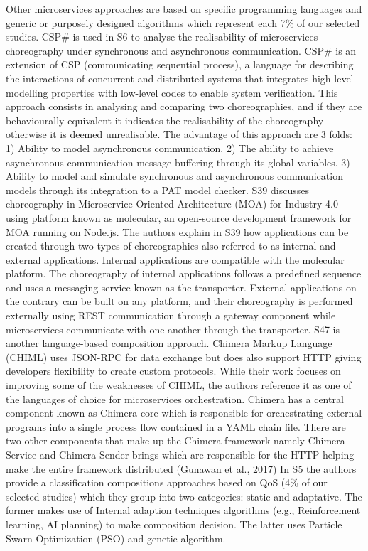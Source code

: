 \documentclass{article}
\begin{document}
\begin{multicols}{2}
Other microservices approaches are based on specific programming languages and generic or purposely designed algorithms which represent each 7\% of our selected studies. CSP\# is used in S6 to analyse the realisability of microservices choreography under synchronous and asynchronous communication. CSP\# is an extension of CSP (communicating sequential process), a language for describing the interactions of concurrent and distributed systems that integrates  high-level modelling properties with low-level codes to enable system verification. This approach consists in analysing and comparing two choreographies, and if they are behaviourally equivalent it indicates the realisability of the choreography otherwise it is deemed unrealisable. The advantage of this approach are 3 folds: 1) Ability to model asynchronous communication. 2) The ability to achieve asynchronous communication message buffering through its global variables. 3) Ability to model and simulate synchronous and asynchronous communication models through its integration to a PAT model checker.
S39 discusses choreography in Microservice Oriented Architecture (MOA) for Industry 4.0 using platform known as molecular,  an open-source development framework for MOA running on Node.js. The authors explain in S39 how applications can be created through two types of choreographies also referred to as internal and external applications. Internal applications are compatible with the molecular platform. The choreography of internal applications follows a predefined sequence and uses a messaging service known as the transporter. External applications on the contrary can be built on any platform, and their choreography is performed externally using REST communication through a gateway component while microservices communicate with one another through the transporter.
S47 is another language-based composition approach. Chimera Markup Language (CHIML) uses JSON-RPC for data exchange but does also support HTTP giving developers flexibility to create custom protocols. While their work focuses on improving some of the weaknesses of CHIML, the authors reference it as one of the languages of choice for microservices orchestration. Chimera has a central component known as Chimera core which is responsible for orchestrating external programs into a single process flow contained in a YAML chain file. There are two other components that make up the Chimera framework namely Chimera-Service and Chimera-Sender brings which are responsible for the HTTP helping make the entire framework distributed (Gunawan et al., 2017)
In S5 the authors provide a classification compositions approaches based on QoS (4\% of our selected studies) which they group into two categories: static and adaptative. The former makes use of Internal adaption techniques algorithms (e.g., Reinforcement learning, AI planning) to make composition decision. The latter uses Particle Swarn Optimization (PSO) and genetic algorithm. 

\end{multicols}
\end{document}
